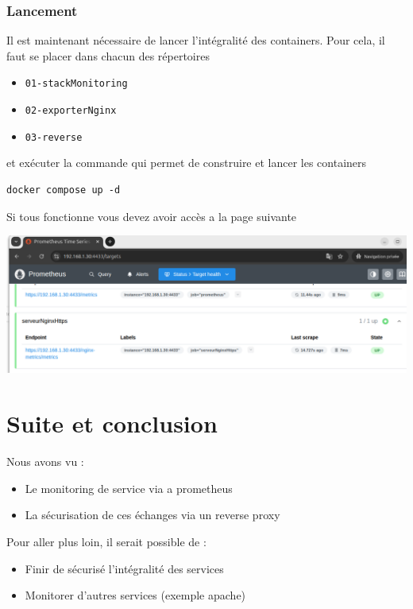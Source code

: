 \documentclass[french, 12pt]{article}%
\newcommand{\itemE}{\item[$\bullet$]}
\begin{document}
\subsubsection{Lancement}

Il est maintenant nécessaire de lancer l'intégralité des containers. Pour cela, il faut se placer dans chacun des répertoires 
\begin{itemize}
\itemE \verb?01-stackMonitoring?
\itemE \verb?02-exporterNginx?
\itemE \verb?03-reverse?
\end{itemize}
et exécuter la commande qui permet de construire et lancer les containers 

\begin{lstlisting}[style=commande]
docker compose up -d
\end{lstlisting}

Si tous fonctionne vous devez avoir accès a la page suivante 

\begin{center}
\includegraphics[scale=0.6]{./ressource/finalPromHTTPS}
\end{center}



\section{Suite et conclusion}

Nous avons vu : 
\begin{itemize}
\itemE Le monitoring de service via a prometheus
\itemE La sécurisation de ces échanges via un reverse proxy 
\end{itemize}

Pour aller plus loin, il serait possible de : 
\begin{itemize}
\itemE Finir de sécurisé l'intégralité des services
\itemE Monitorer d'autres services (exemple apache)
\end{itemize}
\end{document}
